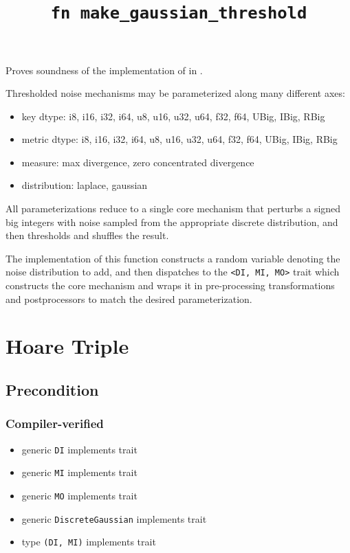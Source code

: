 \documentclass{article}
\title{\texttt{fn make\_gaussian\_threshold}}
\author{\MichaelShoemateAuthor}
\date{}
\begin{document}
\maketitle

\contrib
Proves soundness of the implementation of  in .

Thresholded noise mechanisms may be parameterized along many different axes:
\begin{itemize}
    \item key dtype: i8, i16, i32, i64, u8, u16, u32, u64, f32, f64, UBig, IBig, RBig
    \item metric dtype: i8, i16, i32, i64, u8, u16, u32, u64, f32, f64, UBig, IBig, RBig
    \item measure: max divergence, zero concentrated divergence
    \item distribution: laplace, gaussian
\end{itemize}

All parameterizations reduce to a single core mechanism that perturbs
a signed big integers with noise sampled from the appropriate discrete distribution,
and then thresholds and shuffles the result.

The implementation of this function constructs a random variable denoting the noise distribution to add,
and then dispatches to the \texttt{<DI, MI, MO>} trait
which constructs the core mechanism and wraps it in pre-processing transformations and postprocessors to match the desired parameterization.

\section{Hoare Triple}
\subsection*{Precondition}
\subsubsection*{Compiler-verified}
\begin{itemize}
    \item generic \texttt{DI} implements trait 
    \item generic \texttt{MI} implements trait 
    \item generic \texttt{MO} implements trait 
    \item generic \texttt{DiscreteGaussian} implements trait 
    \item type \texttt{(DI, MI)} implements trait 
\end{itemize}
\end{document}
